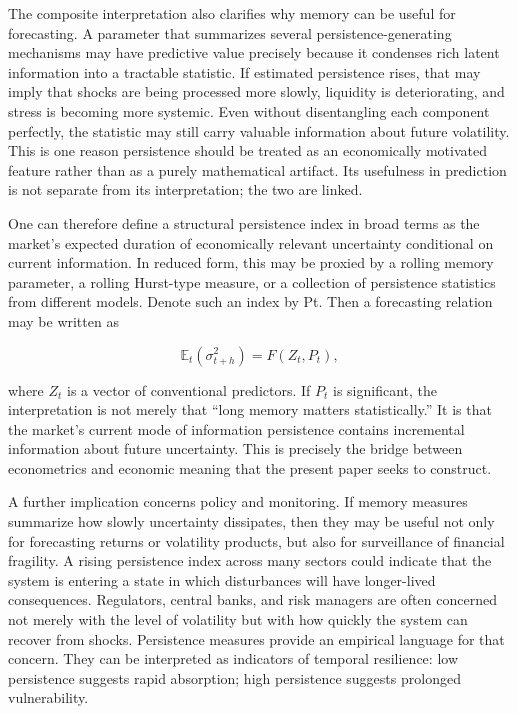 \documentclass[12pt]{article}
\begin{document}
The composite interpretation also clarifies why memory can be useful for forecasting. A parameter that summarizes several persistence-generating mechanisms may have predictive value precisely because it condenses rich latent information into a tractable statistic. If estimated persistence rises, that may imply that shocks are being processed more slowly, liquidity is deteriorating, and stress is becoming more systemic. Even without disentangling each component perfectly, the statistic may still carry valuable information about future volatility. This is one reason persistence should be treated as an economically motivated feature rather than as a purely mathematical artifact. Its usefulness in prediction is not separate from its interpretation; the two are linked.

One can therefore define a structural persistence index in broad terms as the market's expected duration of economically relevant uncertainty conditional on current information. In reduced form, this may be proxied by a rolling memory parameter, a rolling Hurst-type measure, or a collection of persistence statistics from different models. Denote such an index by Pt. Then a forecasting relation may be written as

\[\mathbb{E}_t(\sigma_{t+h}^2) = F(Z_t, P_t),\]

where $Z_t$ is a vector of conventional predictors. If $P_t$ is significant, the interpretation is not merely that ``long memory matters statistically.'' It is that the market's current mode of information persistence contains incremental information about future uncertainty. This is precisely the bridge between econometrics and economic meaning that the present paper seeks to construct.

A further implication concerns policy and monitoring. If memory measures summarize how slowly uncertainty dissipates, then they may be useful not only for forecasting returns or volatility products, but also for surveillance of financial fragility. A rising persistence index across many sectors could indicate that the system is entering a state in which disturbances will have longer-lived consequences. Regulators, central banks, and risk managers are often concerned not merely with the level of volatility but with how quickly the system can recover from shocks. Persistence measures provide an empirical language for that concern. They can be interpreted as indicators of temporal resilience: low persistence suggests rapid absorption; high persistence suggests prolonged vulnerability.
\end{document}
